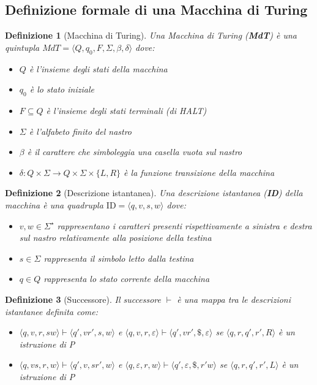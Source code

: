 \documentclass[a4paper,titlepage]{article}
\newtheorem{definition}{Definizione}[section]
\theoremstyle{definition}
\begin{document}
\subsection{Definizione formale di una Macchina di Turing}
\begin{definition}[Macchina di Turing]
	Una Macchina di Turing (\textbf{MdT}) è una quintupla $MdT =\langle Q,q_0,F,\Sigma,\beta,\delta\rangle$ dove:
	\begin{itemize}
		\item $Q$ è l'insieme degli stati della macchina
		\item $q_0$ è lo stato iniziale
		\item $F\subseteq Q$ è l'insieme degli stati terminali (di HALT)
		\item $\Sigma$ è l'alfabeto finito del nastro 
		\item $\beta$ è il carattere che simboleggia una casella vuota sul nastro 
		\item $\delta: Q\times\Sigma\to Q\times\Sigma\times \{L,R\}$ è la funzione transizione della macchina
	\end{itemize}
\end{definition}

\begin{definition}[Descrizione istantanea]
	Una descrizione istantanea (\textbf{ID}) della macchina è una quadrupla $\text{ID} = \langle q,v,s,w \rangle$ dove:
	\begin{itemize}
		\item $v,w\in\Sigma^{\star}$ rappresentano i caratteri presenti rispettivamente a sinistra e destra sul nastro relativamente alla posizione della testina
		\item $s\in\Sigma$ rappresenta il simbolo letto dalla testina
		\item $q\in Q$ rappresenta lo stato corrente della macchina
	\end{itemize}
\end{definition}

\begin{definition}[Successore]
	Il successore $\vdash$ è una mappa tra le descrizioni istantanee definita come:
	\begin{itemize}
		\item $\langle q,v,r,sw\rangle\vdash\langle q',vr',s,w\rangle$ e $\langle q,v,r,\varepsilon\rangle\vdash\langle q',vr',\$,\varepsilon\rangle$ se $\langle q,r,q',r',R\rangle$ è un istruzione di P
		\item $\langle q,vs,r,w\rangle\vdash\langle q',v,sr',w\rangle$ e $\langle q,\varepsilon,r,w\rangle\vdash\langle q',\varepsilon,\$,r'w\rangle$	se $\langle q,r,q',r',L\rangle$ è un istruzione di P
	\end{itemize}
\end{definition}
\end{document}
